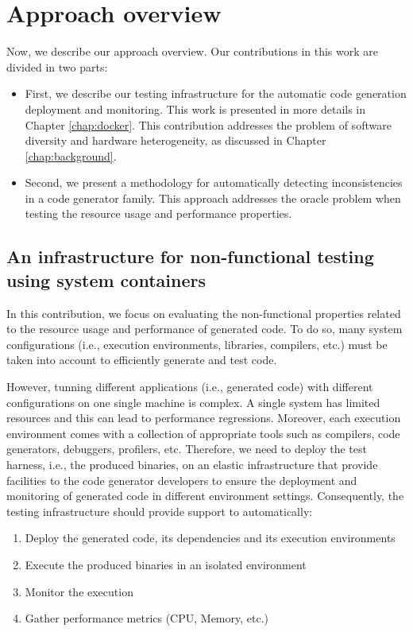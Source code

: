 \section{Approach overview}
\label{sec:cd_approach}
Now, we describe our approach overview. Our contributions in this work are divided in two parts:
\begin{itemize}
	\item First, we describe our testing infrastructure for the automatic code generation deployment and monitoring. This work is presented in more details in Chapter \ref{chap:docker}. This contribution addresses the problem of software diversity and hardware heterogeneity, as discussed in Chapter \ref{chap:background}.
	
	\item Second, we present a methodology for automatically detecting inconsistencies in a code generator family. This approach addresses the oracle problem when testing the resource usage and performance properties.
\end{itemize}


\subsection{An infrastructure for non-functional testing using system containers}
In this contribution, we focus on evaluating the non-functional properties related to the resource usage and performance of generated code. To do so, many system configurations (i.e., execution environments, libraries, compilers, etc.) must be taken into account to efficiently generate and test code. 

However, tunning different applications (i.e., generated code) with different configurations on one single machine is complex. A single system has limited resources and this can lead to performance regressions. Moreover, each execution environment comes with a collection of appropriate tools such as compilers, code generators, debuggers, profilers, etc. Therefore, we need to deploy the test harness, i.e., the produced binaries, on an elastic infrastructure that provide facilities to the code generator developers to ensure the deployment and monitoring of generated code in different environment settings. 
Consequently, the testing infrastructure should provide support to automatically:
\begin{enumerate}
	\item Deploy the generated code, its dependencies and its execution environments
	\item Execute the produced binaries in an isolated environment 
	\item Monitor the execution 
	\item Gather performance metrics (CPU, Memory, etc.)
\end{enumerate}

